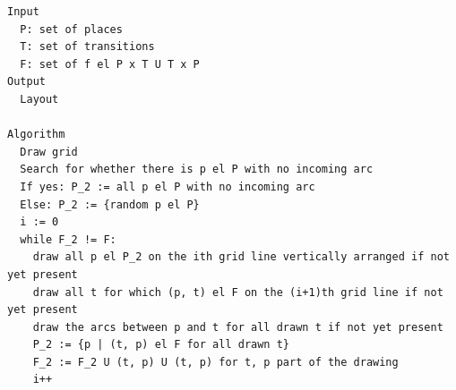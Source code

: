 \begin{verbatim}
Input
  P: set of places
  T: set of transitions
  F: set of f el P x T U T x P
Output
  Layout
  
Algorithm
  Draw grid
  Search for whether there is p el P with no incoming arc
  If yes: P_2 := all p el P with no incoming arc
  Else: P_2 := {random p el P}
  i := 0
  while F_2 != F:
    draw all p el P_2 on the ith grid line vertically arranged if not yet present 
    draw all t for which (p, t) el F on the (i+1)th grid line if not yet present
    draw the arcs between p and t for all drawn t if not yet present
    P_2 := {p | (t, p) el F for all drawn t}
    F_2 := F_2 U (t, p) U (t, p) for t, p part of the drawing
    i++
\end{verbatim}